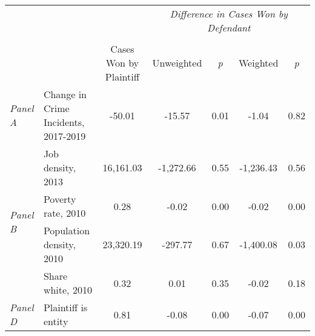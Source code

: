 \begin{tabular}{llccccc}
\toprule
 &  & \textit{} & \multicolumn{4}{c}{\textit{Difference in Cases Won by Defendant}} \\
\cline{4-7}
\\
 &  & Cases Won by Plaintiff & Unweighted & \emph{p} & Weighted & \emph{p} \\
\midrule
\textit{Panel A} & Change in Crime Incidents, 2017-2019 & -50.01 & -15.57 & 0.01 & -1.04 & 0.82 \\
\cline{1-7}
\multirow[c]{4}{.75cm}{\textit{Panel B}} & Job density, 2013 & 16,161.03 & -1,272.66 & 0.55 & -1,236.43 & 0.56 \\
 & Poverty rate, 2010 & 0.28 & -0.02 & 0.00 & -0.02 & 0.00 \\
 & Population density, 2010 & 23,320.19 & -297.77 & 0.67 & -1,400.08 & 0.03 \\
 & Share white, 2010 & 0.32 & 0.01 & 0.35 & -0.02 & 0.18 \\
\cline{1-7}
\textit{Panel D} & Plaintiff is entity & 0.81 & -0.08 & 0.00 & -0.07 & 0.00 \\
\cline{1-7}
\bottomrule
\end{tabular}
